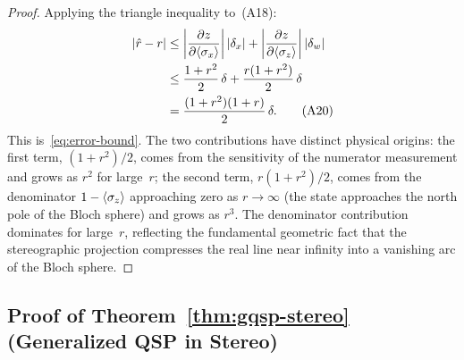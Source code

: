 \begin{proof}
	Applying the triangle inequality to~(A18):
	\begin{align}
		|\hat{r} - r|
		 & \leq \left|\frac{\partial z}{\partial\langle\sigma_x\rangle}\right||\delta_x|
		+ \left|\frac{\partial z}{\partial\langle\sigma_z\rangle}\right||\delta_w|
		\nonumber                                                                       \\
		 & \leq \frac{1+r^2}{2}\,\delta + \frac{r(1+r^2)}{2}\,\delta
		\nonumber                                                                       \\
		 & = \frac{(1+r^2)(1+r)}{2}\,\delta.
		\tag{A20}
	\end{align}
	This is~\eqref{eq:error-bound}.  The two contributions
	have distinct physical origins: the first term,
	$(1+r^2)/2$, comes from the sensitivity of the
	numerator measurement and grows as $r^2$ for large~$r$;
	the second term, $r(1+r^2)/2$, comes from the
	denominator $1 - \langle\sigma_z\rangle$ approaching
	zero as $r \to \infty$ (the state approaches the north
	pole of the Bloch sphere) and grows as $r^3$.  The
	denominator contribution dominates for large~$r$,
	reflecting the fundamental geometric fact that the
	stereographic projection compresses the real line near
	infinity into a vanishing arc of the Bloch sphere.
\end{proof}


\subsection*{Proof of Theorem~\ref{thm:gqsp-stereo} (Generalized QSP in Stereo)}

